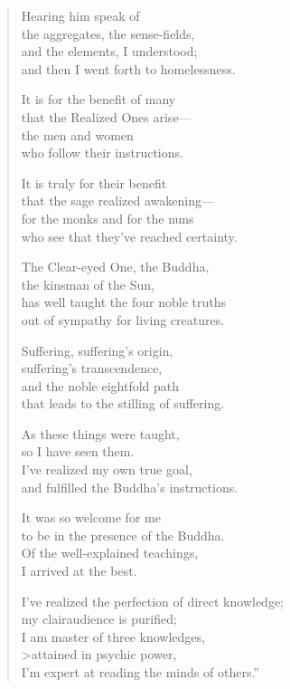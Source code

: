 \documentclass[12pt,openany]{book}%
\begin{document}
\begin{verse}
Hearing him speak of \\
the aggregates, the sense-fields, \\
and the elements, I understood; \\
and then I went forth to homelessness. 

It is for the benefit of many \\
that the Realized Ones arise—\\
the men and women \\
who follow their instructions. 

It is truly for their benefit \\
that the sage realized awakening—\\
for the monks and for the nuns \\
who see that they’ve reached certainty. 

The Clear-eyed One, the Buddha, \\
the kinsman of the Sun, \\
has well taught the four noble truths \\
out of sympathy for living creatures. 

Suffering, suffering’s origin, \\
suffering’s transcendence, \\
and the noble eightfold path \\
that leads to the stilling of suffering. 

As these things were taught, \\
so I have seen them. \\
I’ve realized my own true goal, \\
and fulfilled the Buddha’s instructions. 

It was so welcome for me \\
to be in the presence of the Buddha. \\
Of the well-explained teachings, \\
I arrived at the best. 

I’ve realized the perfection of direct knowledge; \\
my clairaudience is purified; \\
I am master of three knowledges, \\>attained in psychic power, \\
I’m expert at reading the minds of others.” 


\end{verse}
\end{document}
